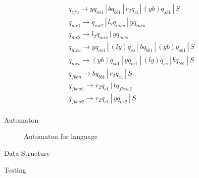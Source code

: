 \documentclass{article}
\begin{document}
\begin{mylist}
\begin{align*}
&q_{cfu} \rightarrow yq_{os1} \, | \,  bq_{bb1} \, | \, r_2q_{c1} | \, (yb)q_{sb1} \, | \, S\\ 
&q_{mc1} \rightarrow q_{mc2} \, | \, l_2q_{mcu} \, | \, yq_{mcu}\\
&q_{mc2} \rightarrow l_2q_{mcs} \, | \, yq_{mcs}\\
&q_{mcu} \rightarrow yq_{os1} \, | \, (ly)q_{ss} \, | \, bq_{bb1} \, | \, (yb)q_{sb1} \, | \, S\\
&q_{mcs} \rightarrow (yb)q_{sb1} \, | \, yq_{os1} \, | \, (ly)q_{ss} \, | \, bq_{bb1}\, | \, S\\
&q_{fben} \rightarrow bq_{bb1} \, | \, r_2q_{c1} \, | \, S\\
&q_{fbew1} \rightarrow r_2q_{c1} \, | \, tq_{fbew2} \\
&q_{fbew2} \rightarrow r_2q_{c1} \, | \, yq_{os2} \, | \, S\\
\end{align*}

\item Automaton

\begin{center}

\begin{figure}[ht]
    \centering
    \caption{Automaton for language}
    \label{fig1:automaton-for-language}
\end{figure}

\end{center}

\newpage
\item Data Structure

\item Testing

\end{mylist}
\end{document}
